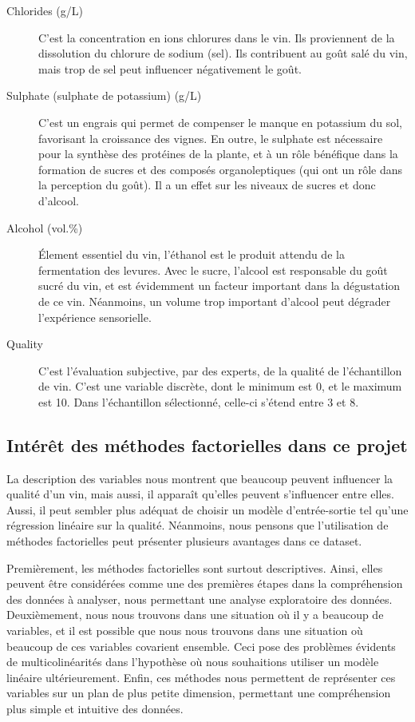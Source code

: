 \documentclass[11pt,a4paper]{article}
\begin{document}
\begin{description}
	\item[Chlorides (g/L)] C'est la concentration en ions chlorures dans le vin. Ils proviennent de la dissolution du chlorure de sodium (sel). Ils contribuent au goût salé du vin, mais trop de sel peut influencer négativement le goût.
	\item[Sulphate (sulphate de potassium) (g/L)] C'est un engrais qui permet de compenser le manque en potassium du sol, favorisant la croissance des vignes. En outre, le sulphate est nécessaire pour la synthèse des protéines de la plante, et à un rôle bénéfique dans la formation de sucres et des composés organoleptiques (qui ont un rôle dans la perception du goût). Il a un effet sur les niveaux de sucres et donc d'alcool.
	\item[Alcohol (vol.\%)] \'Element essentiel du vin, l'éthanol est le produit attendu de la fermentation des levures. Avec le sucre, l'alcool est responsable du goût sucré du vin, et est évidemment un facteur important dans la dégustation de ce vin. Néanmoins, un volume trop important d'alcool peut dégrader l'expérience sensorielle.
	\item[Quality] C'est l'évaluation subjective, par des experts, de la qualité de l'échantillon de vin. C'est une variable discrète, dont le minimum est 0, et le maximum est 10. Dans l'échantillon sélectionné, celle-ci s'étend entre 3 et 8.
\end{description}

\subsection{Intérêt des méthodes factorielles dans ce projet}

La description des variables nous montrent que beaucoup peuvent influencer la qualité d'un vin, mais aussi, il apparaît qu'elles peuvent s'influencer entre elles. Aussi, il peut sembler plus adéquat de choisir un modèle d'entrée-sortie tel qu'une régression linéaire sur la qualité. Néanmoins, nous pensons que l'utilisation de méthodes factorielles peut présenter plusieurs avantages dans ce dataset.

Premièrement, les méthodes factorielles sont surtout descriptives. Ainsi, elles peuvent être considérées comme une des premières étapes dans la compréhension des données à analyser, nous permettant une analyse exploratoire des données.
Deuxièmement, nous nous trouvons dans une situation où il y a beaucoup de variables, et il est possible que nous nous trouvons dans une situation où beaucoup de ces variables covarient ensemble. Ceci pose des problèmes évidents de multicolinéarités dans l'hypothèse où nous souhaitions utiliser un modèle linéaire ultérieurement.
Enfin, ces méthodes nous permettent de représenter ces variables sur un plan de plus petite dimension, permettant une compréhension plus simple et intuitive des données.
\end{document}
